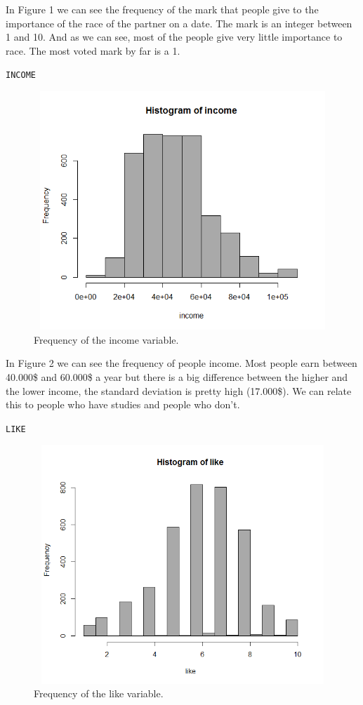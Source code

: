 In Figure 1 we can see the frequency of the mark that people give to the importance of the race of the partner on a date. The mark is an integer between 1 and 10. And as we can see, most of the people give very little importance to race. The most voted mark by far is a 1. 

\newpage
\texttt{INCOME}

\begin{figure}
  \includegraphics[height=9cm, width=13cm]{images/Hist_Plots_Analysis/hist_income.png}
  \caption{Frequency of the income variable.}
  \label{fig:imprace}
\end{figure}

In Figure 2 we can see the frequency of people income. Most people earn between 40.000\$ and 60.000\$ a year but there is a big difference between the higher and the lower income, the standard deviation is pretty high (17.000\$). We can relate this to people who have studies and people who don't.

\newpage
\texttt{LIKE}

\begin{figure}
  \includegraphics[height=9cm, width=13cm]{images/Hist_Plots_Analysis/hist_like.png}
  \caption{Frequency of the like variable.}
  \label{fig:imprace}
\end{figure}


